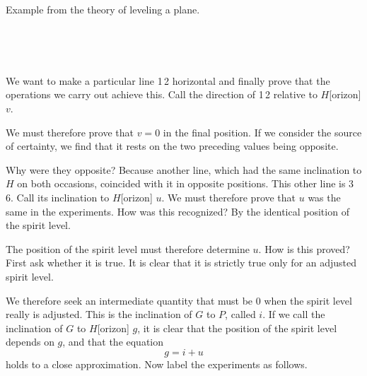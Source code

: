\begin{center}Example from the theory of leveling a plane.\end{center}


\begin{center}
\begin{minipage}[t]{.52\linewidth}\centering{}\\[8pt]\end{minipage}\hfill
\begin{minipage}[t]{.39\linewidth}\centering{}\\[8pt]\end{minipage}
\end{center}



We want to make a particular line 1\,2 horizontal and finally prove that the operations we carry out achieve this. Call the direction of 1\,2 relative to $H$[orizon] $v$.

We must therefore prove that $v=0$ in the final position. If we consider the source of certainty, we find that it rests on the two preceding values being opposite.

Why were they opposite? Because another line, which had the same inclination to $H$ on both occasions, coincided with it in opposite positions. This other line is 3\,6. Call its inclination to $H$[orizon] $u$. We must therefore prove that $u$ was the same in the experiments. How was this recognized? By the identical position of the spirit level.

The position of the spirit level must therefore determine $u$. How is this proved? First ask whether it is true. It is clear that it is strictly true only for an adjusted spirit level.

We therefore seek an intermediate quantity that must be 0 when the spirit level really is adjusted. This is the inclination of $G$ to $P$, called $i$. If we call the inclination of $G$ to $H$[orizon] $g$, it is clear that the position of the spirit level depends on $g$, and that the equation
\[
g = i + u
\]
holds to a close approximation. Now label the experiments as follows.

